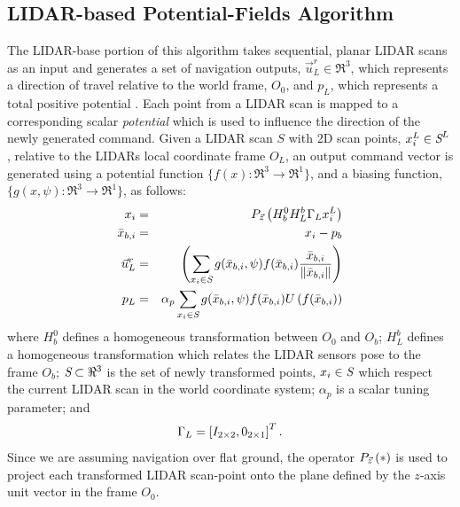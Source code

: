 		\subsection{LIDAR-based Potential-Fields Algorithm}
			The LIDAR-base portion of this algorithm takes sequential, planar LIDAR scans as an input and generates a set of navigation outputs, $\vec{u}^{r}_{L} \in \Re^{3}$, which represents a direction of travel relative to the world frame, $O_{0}$, and $p_{L}$, which represents a total positive potential . Each point from a LIDAR scan is mapped to a corresponding scalar \emph{potential} which is used to influence the direction of the newly generated command. Given a LIDAR scan $S$ with 2D scan points, $x_{i}^{L}\in\emph{S}^{L}$, relative to the LIDARs local coordinate frame $O_{L}$, an output command vector is generated using a potential function $\{ f(x) : \Re^{3}\rightarrow \Re^{1} \}$, and a biasing function, $\{ g(x,\psi) : \Re^{3}\rightarrow \Re^{1} \}$, as follows:
				\begin{eqnarray}
				x_{i}  &=& P_{ \vec{z} } \left( H_{b}^{0} H_{L}^{b} \Gamma_{L} x_{i}^{L} \right) \nonumber\\
				\bar{x}_{b,i} &=&  x_{i}-p_{b} \nonumber \\
				\vec{u}^{r}_{L} &=&  \left( \sum_{x_{i} \in \emph{S}} g( \bar{x}_{b,i},\psi)  f( \bar{x}_{b,i} ) \frac{\bar{x}_{b,i}}{\left\lVert\bar{x}_{b,i}\right\rVert} \right) \nonumber \\
				p_{L} & = & \alpha_{p}\sum_{x_{i} \in \emph{S}} g( \bar{x}_{b,i},\psi)  f( \bar{x}_{b,i} ) U\left(f( \bar{x}_{b,i} )\right)
				\end{eqnarray}
			where $H_{b}^{0}$ defines a homogeneous transformation between $O_{0}$ and $O_{b}$; $H_{L}^{b}$ defines a homogeneous transformation which relates the LIDAR sensors pose to the frame $O_{b}$; $\emph{S}\subset \Re^{3}$ is the set of newly transformed points, $x_{i} \in \emph{S}$ which respect the current LIDAR scan in the world coordinate system; $\alpha_{p}$ is a scalar tuning parameter; and 
				\begin{equation*}
					\Gamma_{L} = \left[ I_{2\times2}, 0_{2\times1} \right]^{T}.
				\end{equation*}
			Since we are assuming navigation over flat ground, the operator $P_{ \vec{z} }\left(*\right)$ is used to project each transformed LIDAR scan-point onto the plane defined by the $z$-axis unit vector in the frame $O_{0}$.

